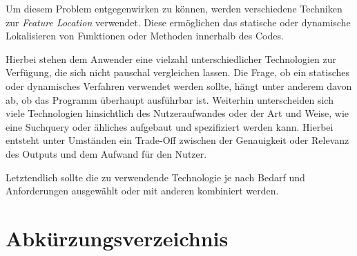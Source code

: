 \documentclass[runningheads,a4paper]{llncs}
\begin{document}
Um diesem Problem entgegenwirken zu können, werden verschiedene Techniken zur \textit{Feature Location} verwendet. Diese ermöglichen das statische oder dynamische Lokalisieren von Funktionen oder Methoden innerhalb des Codes.

Hierbei stehen dem Anwender eine vielzahl unterschiedlicher Technologien zur Verfügung, die sich nicht pauschal vergleichen lassen. Die Frage, ob ein statisches oder dynamisches Verfahren verwendet werden sollte, hängt unter anderem davon ab, ob das Programm überhaupt ausführbar ist. Weiterhin unterscheiden sich viele Technologien hinsichtlich des Nutzeraufwandes oder der Art und Weise, wie eine Suchquery oder ähliches aufgebaut und spezifiziert werden kann. Hierbei entsteht unter Umständen ein Trade-Off zwischen der Genauigkeit oder Relevanz des Outputs und dem Aufwand für den Nutzer.

Letztendlich sollte die zu verwendende Technologie je nach Bedarf und Anforderungen ausgewählt oder mit anderen kombiniert werden.






\clearpage
\listoftables


\section*{Abkürzungsverzeichnis}
\begin{acronym}[FPGA]
\end{acronym}


\clearpage

{}


\end{document}
